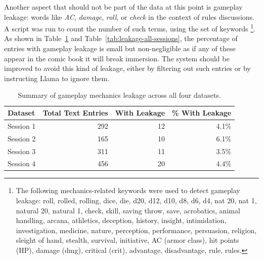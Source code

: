 Another aspect that should not be part of the data at this point is gameplay leakage: words like \textit{AC}, \textit{damage}, \textit{roll}, or \textit{check} in the context of rules discussions. A script was run to count the number of such terms, using the set of keywords \footnote{The following mechanics-related keywords were used to detect gameplay leakage:  roll, rolled, rolling, dice, die, d20, d12, d10, d8, d6, d4, nat 20, nat 1, natural 20, natural 1, check, skill, saving throw, save, acrobatics, animal handling, arcana, athletics, deception, history, insight, intimidation, investigation, medicine, nature, perception, performance, persuasion, religion, sleight of hand, stealth, survival, initiative, AC (armor class), hit points (HP), damage (dmg), critical (crit), advantage, disadvantage, rule, rules.}. As shown in Table~\ref{tab:leakage-summary} and Table~\ref{tab:leakage-all-sessions}, the percentage of entries with gameplay leakage is small but non-negligible as if any of these appear in the comic book it will break immersion. The system should be improved to avoid this kind of leakage, either by filtering out such entries or by instructing Llama to ignore them.

\begin{table}[h]
\centering
\begin{tabular}{l r r r}
\hline
\textbf{Dataset} & \textbf{Total Text Entries} & \textbf{With Leakage} & \textbf{\% With Leakage} \\
\hline
Session 1 & 292 & 12 & 4.1\% \\
Session 2 & 165 & 10 & 6.1\% \\
Session 3 & 311 & 11 & 3.5\% \\
Session 4 & 456 & 20 & 4.4\% \\
\hline
\end{tabular}
\caption{Summary of gameplay mechanics leakage across all four datasets.}
\label{tab:leakage-summary}
\end{table}


